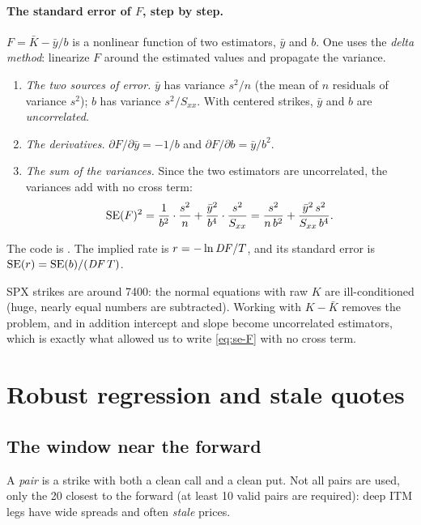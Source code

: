 \paragraph{The standard error of \texorpdfstring{$F$}{F}, step by step.} $F=\bar K-\bar y/b$ is a nonlinear function
of two estimators, $\bar y$ and $b$. One uses the \emph{delta method}: linearize $F$ around the estimated values and
propagate the variance.
\begin{enumerate}
\item \emph{The two sources of error.} $\bar y$ has variance $s^2/n$ (the mean of $n$ residuals of variance $s^2$);
$b$ has variance $s^2/S_{xx}$. With centered strikes, $\bar y$ and $b$ are \emph{uncorrelated}.
\item \emph{The derivatives.} $\partial F/\partial\bar y=-1/b$ and $\partial F/\partial b=\bar y/b^2$.
\item \emph{The sum of the variances.} Since the two estimators are uncorrelated, the variances add with no cross
term:
\begin{equation}\label{eq:se-F}
\mathrm{SE}(F)^2=\frac{1}{b^2}\cdot\frac{s^2}{n}+\frac{\bar y^2}{b^4}\cdot\frac{s^2}{S_{xx}}
=\frac{s^2}{n\,b^2}+\frac{\bar y^2\,s^2}{S_{xx}\,b^4}.
\end{equation}
\end{enumerate}
The code is . The implied rate is $r=-\ln\mathit{DF}/T$, and its standard error is
$\mathrm{SE}(r)=\mathrm{SE}(b)/(\mathit{DF}\,T)$.

\begin{attenzione}[title={Why center the strikes}]
SPX strikes are around 7400: the normal equations with raw $K$ are ill-conditioned (huge, nearly equal numbers are
subtracted). Working with $K-\bar K$ removes the problem, and in addition intercept and slope become uncorrelated
estimators, which is exactly what allowed us to write \eqref{eq:se-F} with no cross term.
\end{attenzione}

\section{Robust regression and stale quotes}
\subsection{The window near the forward}
A \emph{pair} is a strike with both a clean call and a clean put. Not all pairs are used, only the 20 closest to the
forward (at least 10 valid pairs are required): deep ITM legs have wide spreads and often \emph{stale} prices.

